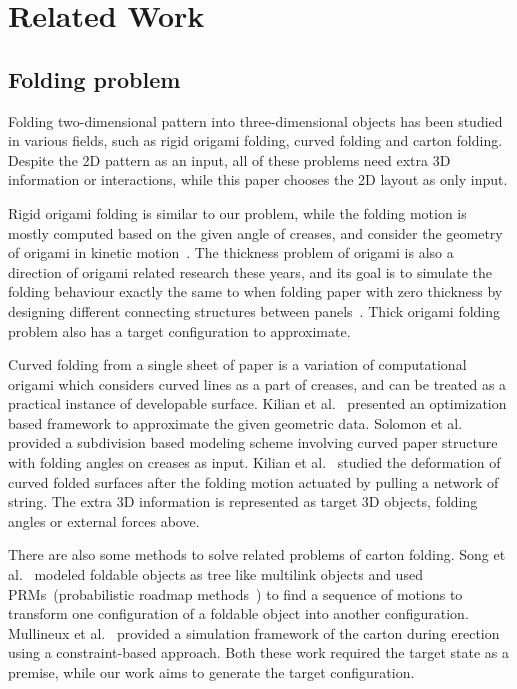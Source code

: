 \section{Related Work}\label{sec:relatedwork}
\subsection{Folding problem}
Folding two-dimensional pattern into three-dimensional objects has been studied in various fields, such as rigid origami folding, curved folding and carton folding. Despite the 2D pattern as an input, all of these problems need extra 3D information or interactions, while this paper chooses the 2D layout as only input.

Rigid origami folding is similar to our problem, while the folding motion is mostly computed based on the given angle of creases, and consider the geometry of origami in kinetic motion~\cite{tachi2009simulation,tachigeometric}. The thickness problem of origami is also a direction of origami related research these years, and its goal is to simulate the folding behaviour exactly the same to when folding paper with zero thickness by designing different connecting structures between panels~\cite{chen2015origami,2016arXiv160105747K,tachi2011rigid}. Thick origami folding problem also has a target configuration to approximate.

Curved folding from a single sheet of paper is a variation of computational origami which considers curved lines as a part of creases, and can be treated as a practical instance of developable surface. Kilian et al.~\cite{Kilian:2008:CF:1360612.1360674} presented an optimization based framework to approximate the given geometric data. Solomon et al.~\cite{Solomon:2012:FDS:2346796.2346817} provided a subdivision based modeling scheme involving curved paper structure with folding angles on creases as input. Kilian et al.~\cite{Kilian:2017:SAC:3087678.3015460} studied the deformation of curved folded surfaces after the folding motion actuated by pulling a network of string. The extra 3D information is represented as target 3D objects, folding angles or external forces above.

There are also some methods to solve related problems of carton folding. 
Song et al.~\cite{Song:2000:MPA:892954} modeled foldable objects as tree like multilink objects and used PRMs~(probabilistic roadmap methods~\cite{Kavraki:1994:PRP:891758}) to find a sequence of motions to transform one configuration of a foldable object into another configuration. 
Mullineux et al.~\cite{Mullineux:2010:CSC:1739328.1739673} provided a simulation framework of the carton during erection using a constraint-based approach. Both these work required the target state as a premise, while our work aims to generate the target configuration.

